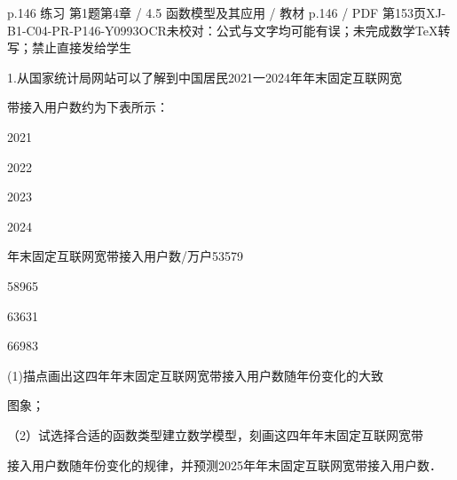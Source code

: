 \begin{bankitem}{p.146 练习 第1题}{第4章 / 4.5 函数模型及其应用 / 教材 p.146 / PDF 第153页}{XJ-B1-C04-PR-P146-Y0993}{OCR未校对：公式与文字均可能有误；未完成数学TeX转写；禁止直接发给学生}
\begin{ocrdraft}
\par
1.从国家统计局网站可以了解到中国居民2021一2024年年末固定互联网宽
\par
带接入用户数约为下表所示：
\par
2021
\par
2022
\par
2023
\par
2024
\par
年末固定互联网宽带接入用户数/万户53579
\par
58965
\par
63631
\par
66983
\par
(1)描点画出这四年年末固定互联网宽带接入用户数随年份变化的大致
\par
图象；
\par
（2）试选择合适的函数类型建立数学模型，刻画这四年年末固定互联网宽带
\par
接入用户数随年份变化的规律，并预测2025年年末固定互联网宽带接入用户数．
\end{ocrdraft}
\end{bankitem}
